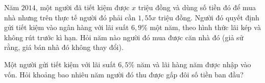 \begin{bt}%
Năm $2014$, một người đã tiết kiệm được $x$ triệu đồng và dùng số tiền đó để mua nhà nhưng trên thực tế người đó phải cần $1{,}55 x$ triệu đồng. Người đó quyết định gửi tiết kiệm vào ngân hàng với lãi suất $6{,}9\%$ một năm, theo hình thức lãi kép và không rút trước kì hạn. Hỏi năm nào người đó mua được căn nhà đó (giả sử rằng, giá bán nhà đó không thay đổi).
\end{bt}
\begin{bt}%
Một người gửi tiết kiệm với lãi suất $6{,}5\%$ năm và lãi hàng năm được nhập vào vốn. Hỏi khoảng bao nhiêu năm người đó thu được gấp đôi số tiền ban đầu?
\end{bt}



